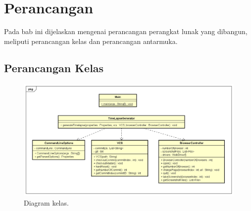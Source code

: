 \chapter{Perancangan}
\label{chap:Perancangan}

Pada bab ini dijelaskan mengenai perancangan perangkat lunak yang dibangun, meliputi perancangan kelas dan perancangan antarmuka.

\section{Perancangan Kelas}
\label{sec:perancangan_kelas}
\begin{figure}[H]
	\centering
		\includegraphics[scale=0.5]{Gambar/ClassDiagram.png}
	\caption{Diagram kelas.}
	\label{fig:class_diagram}
\end{figure}

